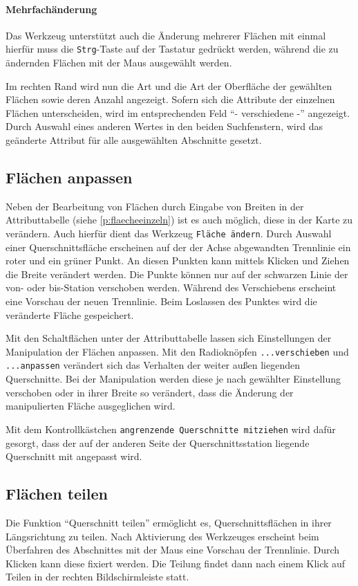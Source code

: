 \documentclass[a4paper,11pt,bibliography=totoc, listof=totoc,titlepage]{scrartcl}
\begin{document}
\paragraph{Mehrfachänderung}
Das Werkzeug unterstützt auch die Änderung mehrerer Flächen mit einmal hierfür muss die \verb|Strg|-Taste auf der Tastatur gedrückt werden, während die zu ändern\-den Flächen mit der Maus ausgewählt werden.

Im rechten Rand wird nun die Art und die Art der Oberfläche der gewählten Flächen sowie deren Anzahl angezeigt. Sofern sich die Attribute der einzelnen Flächen unterscheiden, wird im entsprechenden Feld ``- verschiedene -'' angezeigt. Durch Auswahl eines anderen Wertes in den beiden \Gls{Suchfenster}n, wird das geänderte Attribut für alle ausgewählten Abschnitte gesetzt.

\subsection{Flächen anpassen}
Neben der Bearbeitung von Flächen durch Eingabe von Breiten in der Attributtabelle (siehe \autoref{p:flaecheeinzeln}) ist es auch möglich, diese in der Karte zu verändern. Auch hierfür dient das Werkzeug \verb|Fläche ändern|. Durch Auswahl einer Querschnittsfläche erscheinen auf der der Achse abgewandten Trennlinie ein roter und ein grüner Punkt. An diesen Punkten kann mittels Klicken und Ziehen die Breite verändert werden. Die Punkte können nur auf der schwarzen Linie der von- oder bis-Station verschoben werden. Während des Verschiebens erscheint eine Vorschau der neuen Trennlinie. Beim Loslassen des Punktes wird die veränderte Fläche gespeichert.

Mit den Schaltflächen unter der Attributtabelle lassen sich Einstellungen der Manipulation der Flächen anpassen. Mit den Radioknöpfen \verb|...verschieben| und \verb|...anpassen| verändert sich das Verhalten der weiter außen liegenden Querschnitte. Bei der Manipulation werden diese je nach gewählter Einstellung verschoben oder in ihrer Breite so verändert, dass die Änderung der manipulierten Fläche ausgeglichen wird.

Mit dem Kontrollkästchen \verb|angrenzende Querschnitte mitziehen| wird dafür gesorgt, dass der auf der anderen Seite der Querschnittsstation liegende Querschnitt mit angepasst wird.

\subsection{Flächen teilen}
Die Funktion ``Querschnitt teilen'' ermöglicht es, Querschnittsflächen in ihrer Längsrichtung zu teilen. Nach Aktivierung des Werkzeuges erscheint beim Überfahren des Abschnittes mit der Maus eine Vorschau der Trennlinie. Durch Klicken kann diese fixiert werden. Die Teilung findet dann nach einem Klick auf Teilen in der rechten Bildschirmleiste statt.
\end{document}
